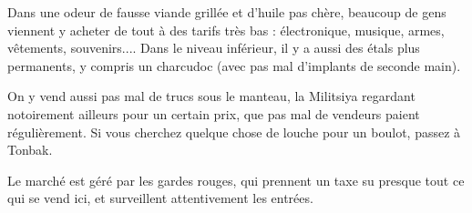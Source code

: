 \documentclass[10pt,a4paper]{book}
\begin{document}
Dans une odeur de fausse viande grillée et d'huile pas chère, beaucoup de gens viennent y acheter de tout à des tarifs très bas : électronique, musique, armes, vêtements, souvenirs.... Dans le niveau inférieur, il y a aussi des étals plus permanents, y compris un charcudoc (avec pas mal d'implants de seconde main). 

On y vend aussi pas mal de trucs sous le manteau, la Militsiya regardant notoirement ailleurs pour un certain prix, que pas mal de vendeurs paient régulièrement. Si vous cherchez quelque chose de louche pour un boulot, passez à Tonbak.

Le marché est géré par les gardes rouges, qui prennent un taxe su presque tout ce qui se vend ici, et surveillent attentivement les entrées.
\end{document}
